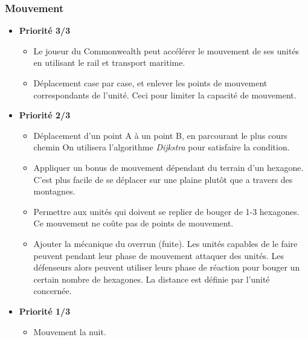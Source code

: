 \subsubsection{Mouvement}
\begin{itemize}
    \item \textbf{Priorité 3/3}
    \begin{itemize}
        \item Le joueur du Commonwealth peut accélérer le mouvement de ses unités en utilisant le rail et transport maritime.\xmark
        \item Déplacement case par case, et enlever les points de mouvement correspondants de l'unité. Ceci pour limiter la capacité de mouvement.\cmark
    \end{itemize}
    \item \textbf{Priorité 2/3}
    \begin{itemize}
        \item Déplacement d'un point A à un point B, en parcourant le plus cours chemin
            On utilisera l'algorithme \emph{Dijkstra} pour satisfaire la condition.\cmark
        \item Appliquer un bonus de mouvement dépendant du terrain d'un hexagone. C'est plus facile de se déplacer sur une plaine plutôt que a travers des montagnes.
        \item Permettre aux unités qui doivent se replier de bouger de 1-3 hexagones. Ce mouvement ne coûte pas de points de mouvement.\cmark
        \item Ajouter la mécanique du overrun (fuite). Les unités capables de le faire peuvent pendant leur phase de mouvement attaquer des unités. Les défenseurs alors peuvent utiliser leurs phase de réaction pour bouger un certain nombre de hexagones. La distance est définie par l'unité concernée.\xmark
    \end{itemize}   
    \item \textbf{Priorité 1/3}
    \begin{itemize}
        \item Mouvement la nuit.
    \end{itemize}
\end{itemize}

